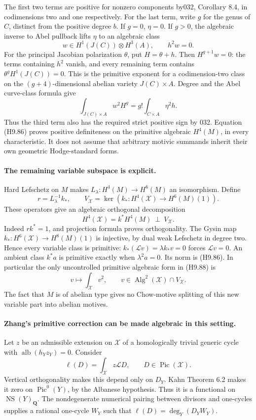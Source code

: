 The first two terms are positive for nonzero components by032,
Corollary 8.4, in codimensions two and one respectively. For the
last term, write $g$ for the genus of $C$, distinct from the
positive degree $b$. If $g=0$, $\eta=0$. If $g>0$, the algebraic
inverse to Abel pullback lifts $\eta$ to an algebraic class
\[
 w\in H^1(J(C))\otimes H^3(A),\qquad h^2w=0.
\]
For the principal Jacobian polarization $\theta$, put $H=\theta+h$.
Then $H^{g+1}w=0$: the terms containing $h^2$ vanish, and every
remaining term contains $\theta^gH^1(J(C))=0$. This is the
primitive exponent for a codimension-two class on the
$(g+4)$-dimensional abelian variety $J(C)\times A$. Degree and
the Abel curve-class formula give
\[
 \int_{J(C)\times A}w^2H^g
       =g!\int_{C\times A}\eta^2h.                        \tag{H9.87}
\]
Thus the third term also has the required strict positive sign by
032. Equation (H9.86) proves positive definiteness on the
primitive algebraic $H^4(M)$, in every characteristic. It does
not assume that arbitrary motivic summands inherit their own
geometric Hodge-standard forms.

\paragraph{The remaining variable subspace is explicit.}
Hard Lefschetz on $M$ makes
$L_\lambda:H^4(M)\to H^6(M)$ an isomorphism. Define
\[
 r=L_\lambda^{-1}k_*,\qquad
 V_{\mathcal X}=\ker(k_*:H^4(\mathcal X)\to H^6(M)(1)).
\]
These operators give an algebraic orthogonal decomposition
\[
 H^4(\mathcal X)=k^*H^4(M)\ \mathbin\perp\ V_{\mathcal X}.
                                                               \tag{H9.88}
\]
Indeed $rk^*=1$, and projection formula proves orthogonality.
The Gysin map $k_*:H^6(\mathcal X)\to H^8(M)(1)$ is injective,
by dual weak Lefschetz in degree two. Hence every variable class
is primitive: $k_*(\mathcal L v)=\lambda k_*v=0$ forces
$\mathcal L v=0$. An ambient class $k^*a$ is primitive exactly
when $\lambda^2a=0$. Its norm is (H9.86). In particular the only
uncontrolled primitive algebraic form in (H9.88) is
\[
        v\longmapsto\int_{\mathcal X}v^2,
            \qquad v\in\operatorname{Alg}^2(\mathcal X)
                                  \cap V_{\mathcal X}.      \tag{H9.89}
\]
The fact that $M$ is of abelian type gives no Chow-motive splitting
of this new variable part into abelian motives.

\paragraph{Zhang's primitive correction can be made algebraic in this setting.}
Let $z$ be an admissible extension on $\mathcal X$ of a
homologically trivial generic cycle with
$\operatorname{alb}(h_Yz_Y)=0$. Consider
\[
         \ell(D)=\int_{\mathcal X}z\mathcal L D,
                                      \qquad D\in\operatorname{Pic}(\mathcal X).
\]
Vertical orthogonality makes this depend only on $D_Y$.
Kahn Theorem 6.2 makes it zero on $\operatorname{Pic}^0(Y)$,
by the Albanese hypothesis. Thus it is a functional on
$\operatorname{NS}(Y)_{\mathbf Q}$. The nondegenerate numerical
pairing between divisors and one-cycles supplies a rational
one-cycle $W_Y$ such that
$\ell(D)=\deg_Y(D_YW_Y)$.

